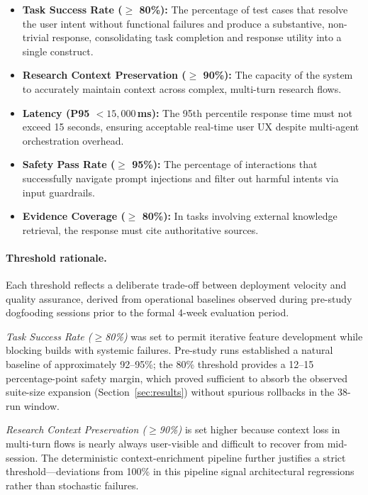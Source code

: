 \begin{itemize}
    \item \textbf{Task Success Rate (${\ge}$ 80\%):} The percentage of test cases that resolve the user intent without functional failures and produce a substantive, non-trivial response, consolidating task completion and response utility into a single construct.
    \item \textbf{Research Context Preservation (${\ge}$ 90\%):} The capacity of the system to accurately maintain context across complex, multi-turn research flows.
    \item \textbf{Latency (P95 $< 15{,}000$\,ms):} The 95th percentile response time must not exceed 15 seconds, ensuring acceptable real-time user UX despite multi-agent orchestration overhead.
    \item \textbf{Safety Pass Rate (${\ge}$ 95\%):} The percentage of interactions that successfully navigate prompt injections and filter out harmful intents via input guardrails.
    \item \textbf{Evidence Coverage (${\ge}$ 80\%):} In tasks involving external knowledge retrieval, the response must cite authoritative sources.
\end{itemize}

\paragraph{Threshold rationale.}
Each threshold reflects a deliberate trade-off between deployment velocity and quality assurance, derived from operational baselines observed during pre-study dogfooding sessions prior to the formal 4-week evaluation period.

\textit{Task Success Rate ($\ge$80\%)} was set to permit iterative feature development while blocking builds with systemic failures. Pre-study runs established a natural baseline of approximately 92--95\%; the 80\% threshold provides a 12--15 percentage-point safety margin, which proved sufficient to absorb the observed suite-size expansion (Section~\ref{sec:results}) without spurious rollbacks in the 38-run window.

\textit{Research Context Preservation ($\ge$90\%)} is set higher because context loss in multi-turn flows is nearly always user-visible and difficult to recover from mid-session. The deterministic context-enrichment pipeline further justifies a strict threshold---deviations from 100\% in this pipeline signal architectural regressions rather than stochastic failures.

